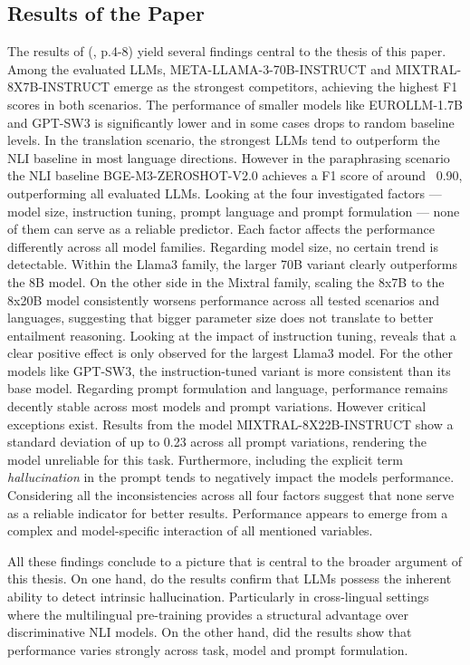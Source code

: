\documentclass[
  seminar,   	 
  english,   	 
  titlepage=on,
  captions=tableheadings
]{ttlab-qualify}
\begin{document}
\subsection{Results of the Paper}
The results of (\cite{Gogoulou2025LLMHallucinationDetection}, p.4-8) yield several findings central to the thesis of this paper. Among the evaluated LLMs, META-LLAMA-3-70B-INSTRUCT and MIXTRAL-8X7B-INSTRUCT emerge as the strongest competitors, achieving the highest F1 scores in both scenarios. The performance of smaller models like EUROLLM-1.7B and GPT-SW3 is significantly lower and in some cases drops to random baseline levels. In the translation scenario, the strongest LLMs tend to outperform the NLI baseline in most language directions. However in the paraphrasing scenario the NLI baseline BGE-M3-ZEROSHOT-V2.0 achieves a F1 score of around ~0.90, outperforming all evaluated LLMs.
Looking at the four investigated factors — model size, instruction tuning, prompt language and prompt formulation — none of them can serve as a reliable predictor. Each factor affects the performance differently across all model families. Regarding model size, no certain trend is detectable. Within the Llama3 family, the larger 70B variant clearly outperforms the 8B model. On the other side in the Mixtral family, scaling the 8x7B to the 8x20B model consistently worsens performance across all tested scenarios and languages, suggesting that bigger parameter size does not translate to better entailment reasoning. Looking at the impact of instruction tuning, reveals that a clear positive effect is only observed for the largest Llama3 model. For the other models like GPT-SW3, the instruction-tuned variant is more consistent than its base model. Regarding prompt formulation and language, performance remains decently stable across most models and prompt variations. However critical exceptions exist. Results from the model MIXTRAL-8X22B-INSTRUCT show a standard deviation of up to 0.23 across all prompt variations, rendering the model unreliable for this task. Furthermore, including the explicit term \textit{hallucination} in the prompt tends to negatively impact the models performance. Considering all the inconsistencies across all four factors suggest that none serve as a reliable indicator for better results. Performance appears to emerge from a complex and model-specific interaction of all mentioned variables.

All these findings conclude to a picture that is central to the broader argument of this thesis. On one hand, do the results confirm that LLMs possess the inherent ability to detect intrinsic hallucination. Particularly in cross-lingual settings where the multilingual pre-training provides a structural advantage over discriminative NLI models. On the other hand, did the results show that performance varies strongly across task, model and prompt formulation.
\end{document}
